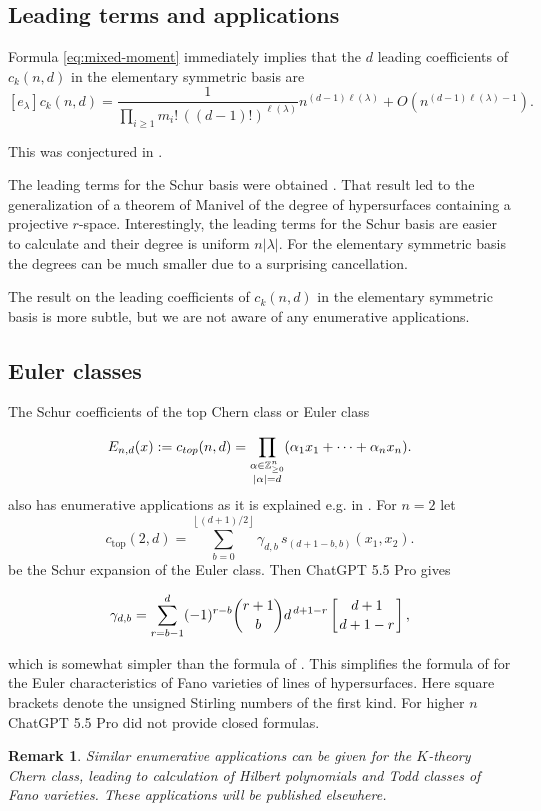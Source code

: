 \documentclass[10pt,a4paper]{amsart}
\numberwithin{equation}{section}
\newtheorem{remark}[theorem]{Remark}
\newcommand{\Z}{\mathbb Z}
\begin{document}
\subsection{Leading terms and applications}
Formula \eqref{eq:mixed-moment} immediately implies that the $d$ leading coefficients of $c_k(n,d)$ in the elementary symmetric basis are
\[ [e_\lambda]{c_k(n,d)}
  =
  \frac{1}{\prod_{i\ge1}m_i!\,((d-1)!)^{\ell(\lambda)}}
  n^{(d-1)\ell(\lambda)}
  +O\left(n^{(d-1)\ell(\lambda)-1}\right).
\]

This was conjectured in \cite[Conj 3.10]{feher2025polynomiality}. 

The leading terms for the Schur basis were obtained \cite{feher2025polynomiality}. That result led to the generalization of a theorem of Manivel of the degree of hypersurfaces containing a projective  $r$-space. Interestingly, the leading terms for the Schur basis are easier to calculate and their degree is uniform $n|\lambda|$. For the elementary symmetric basis the degrees can be much smaller due to a surprising cancellation.

The result on the leading coefficients of $c_k(n,d)$ in the elementary symmetric basis is more subtle, but we are not aware of any enumerative applications.

\subsection{Euler classes}
The Schur coefficients of the top Chern class or Euler class 

\begin{equation}\label{eq:etop}
  E_{n,d}(x):=c_{\rm top}(n,d)=
  \prod_{\substack{\alpha\in\Z_{\ge0}^n\\|\alpha|=d}}
  (\alpha_1x_1+\cdots+\alpha_nx_n).
\end{equation}
also has enumerative applications as it is explained e.g. in \cite{feher2025polynomiality}.  For $n=2$ let 
\[
c_{\mathrm{top}}(2,d)
=
\sum_{b=0}^{\left\lfloor (d+1)/2\right\rfloor}
\gamma_{d,b}\,
s_{(d+1-b,b)}(x_1,x_2).
\]
be the Schur expansion of the Euler class. Then ChatGPT 5.5 Pro gives

\[
\gamma_{d,b}
=
\sum_{r=b-1}^{d}
(-1)^{r-b}
\binom{r+1}{b}
d^{\,d+1-r}
\left[{d+1\atop d+1-r}\right],
\]

which is somewhat simpler than the formula of \cite{feher2025polynomiality}. This simplifies the formula of \cite{feher2025polynomiality} for the Euler characteristics of Fano varieties of lines of hypersurfaces. Here square brackets denote the unsigned Stirling numbers of the first kind.
For higher $n$ ChatGPT 5.5 Pro did not provide closed formulas.
\bigskip
\begin{remark}
Similar enumerative applications can be given for the $K$-theory Chern class, leading to calculation of Hilbert polynomials and Todd classes of Fano varieties. These applications will be published elsewhere.
\end{remark}
\end{document}

